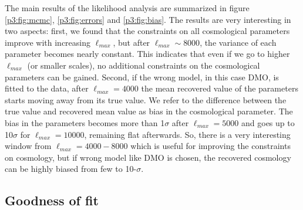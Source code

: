\documentclass[
  11pt,
  twoside,
  openright,
  titlepage,
  headings=optiontoheadandtoc
]{scrbook}
\begin{document}
The main results of the likelihood analysis are summarized in figure \ref{p3:fig:mcmc}, \ref{p3:fig:errors} and \ref{p3:fig:bias}. The results are very interesting in two aspects: first, we found that the constraints on all cosmological parameters improve with increasing $\ell_{max}$, but after $\ell_{max} \sim 8000$, the variance of each parameter becomes nearly constant. This indicates that even if we go to higher $\ell_{max}$ (or smaller scales), no additional constraints on the cosmological parameters can be gained. Second, if the wrong model, in this case DMO, is fitted to the data, after $\ell_{max}=4000$ the mean recovered value of the parameters starts moving away from its true value. We refer to the difference between the true value and recovered mean value as bias in the cosmological parameter. The bias in the parameters becomes more than 1$\sigma$ after $\ell_{max}=5000$ and goes up to 10$\sigma$ for $\ell_{max}=10000$, remaining flat afterwards. So, there is a very interesting window from $\ell_{max}=4000-8000$ which is useful for improving the constraints on cosmology, but if wrong model like DMO is chosen, the recovered cosmology can be highly biased from few to 10-$\sigma$.

\subsection{Goodness of fit}
\end{document}

